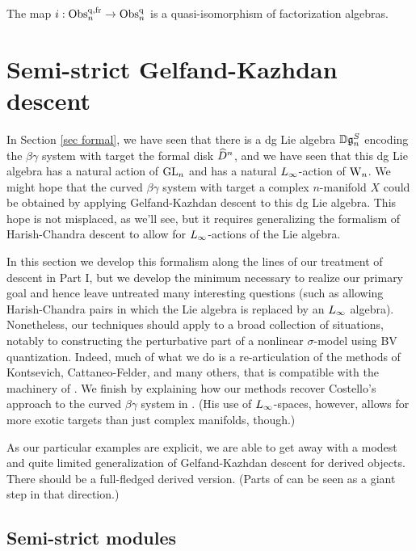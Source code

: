 \begin{prop}
\label{equiv of noneq}
The map $i: {\rm Obs}^{{\rm q},{\rm fr}}_n \to {\rm Obs}^{{\rm q}}_n$ is a quasi-isomorphism of factorization algebras.
\end{prop}

\section{Semi-strict Gelfand-Kazhdan descent}
\label{sec ss GK descent}

In Section \ref{sec formal}, we have seen that there is a dg Lie algebra $\mathbb D \mathfrak{g}_n^S$ 
encoding the $\beta\gamma$ system with target the formal disk $\widehat{D}^n$, 
and we have seen that this dg Lie algebra has a natural action of ${\rm GL}_n$ and has a natural $\L8$-action of ${{\rm W}_n}$. 
We might hope that the curved $\beta\gamma$ system with target a complex $n$-manifold $X$ could be obtained 
by applying Gelfand-Kazhdan descent to this dg Lie algebra.
This hope is not misplaced, as we'll see, 
but it requires generalizing the formalism of Harish-Chandra descent to allow for $\L8$-actions of the Lie algebra.

In this section we develop this formalism along the lines of our treatment of descent in Part I,
but we develop the minimum necessary to realize our primary goal and hence leave untreated many interesting questions
(such as allowing Harish-Chandra pairs in which the Lie algebra is replaced by an $\L8$ algebra).
Nonetheless, our techniques should apply to a broad collection of situations, 
notably to constructing the perturbative part of a nonlinear $\sigma$-model using BV quantization.
Indeed, much of what we do is a re-articulation of the methods of Kontsevich, Cattaneo-Felder, and many others, 
that is compatible with the machinery of \cite{CG1, CG2}.
We finish by explaining how our methods recover Costello's approach to the curved $\beta\gamma$ system in \cite{WG2}.
(His use of $\L8$-spaces, however, allows for more exotic targets than just complex manifolds, though.)

\begin{rmk}
As our particular examples are explicit, we are able to get away with 
a modest and quite limited generalization of Gelfand-Kazhdan descent for derived objects.
There should be a full-fledged derived version. 
(Parts of \cite{CPTVV} can be seen as a giant step in that direction.)
\end{rmk}

\subsection{Semi-strict modules}

